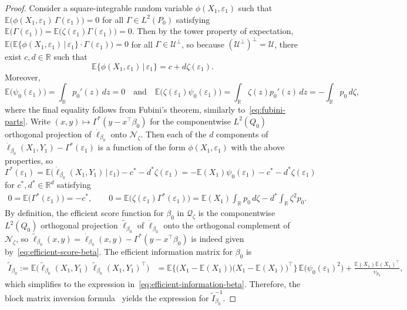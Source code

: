 \documentclass[a4paper]{article}
\newcommand{\R}{\mathbb{R}}
\newcommand{\E}{\mathbb{E}}
\theoremstyle{definition}
\begin{document}
\begin{proof}
Consider a square-integrable random variable $\phi(X_1,\varepsilon_1)$ such that $\E\bigl(\phi(X_1,\varepsilon_1)\,\Gamma(\varepsilon_1)\bigr) = 0$ for all $\Gamma \in L^2(P_0)$ satisfying $\E\bigl(\Gamma(\varepsilon_1)\bigr) = \E\bigl(\zeta(\varepsilon_1)\Gamma(\varepsilon_1)\bigr) = 0$. Then by the tower property of expectation, $\E\bigl(\E\{\phi(X_1,\varepsilon_1)\,|\,\varepsilon_1\} \cdot \Gamma(\varepsilon_1)\bigr) = 0$ for all $\Gamma \in \mathcal{U}^\perp$, so because $(\mathcal{U}^\perp)^\perp = \mathcal{U}$, there exist $c,d \in \R$ such that
\[
\E\{\phi(X_1,\varepsilon_1)\,|\,\varepsilon_1\} = c + d\zeta(\varepsilon_1).
\]
Moreover,
\[
\E\bigl(\psi_0(\varepsilon_1)\bigr) = \int_\R p_0'(z)\,dz = 0 \quad\text{and}\quad \E\bigl(\zeta(\varepsilon_1)\psi_0(\varepsilon_1)\bigr) = \int_\R \zeta(z)p_0'(z)\,dz = -\int_\R p_0\,d\zeta,
\]
where the final equality follows from Fubini's theorem, similarly to~\eqref{eq:fubini-parts}. Write $(x,y) \mapsto \Gamma^*(y - x^\top\beta_0)$ for the componentwise $L^2(Q_0)$ orthogonal projection of $\dot{\ell}_{\beta_0}$ onto $\mathcal{N}_\zeta$. Then each of the $d$ components of $\dot{\ell}_{\beta_0}(X_1,Y_1) - \Gamma^*(\varepsilon_1)$ is a function of the form $\phi(X_1,\varepsilon_1)$ with the above properties, so
\[
\Gamma^*(\varepsilon_1) = \E\bigl(\dot{\ell}_{\beta_0}(X_1,Y_1)\,|\,\varepsilon_1\bigr)- c^* - d^*\zeta(\varepsilon_1) = -\E(X_1)\psi_0(\varepsilon_1) - c^* - d^*\zeta(\varepsilon_1)
\]
for $c^*,d^* \in \R^d$ satisfying
\begin{align*}
0 = \E\bigl(\Gamma^*(\varepsilon_1)\bigr) = -c^*, \qquad 
0 = \E\bigl(\zeta(\varepsilon_1)\Gamma^*(\varepsilon_1)\bigr) = \E(X_1)\int_\R p_0\,d\zeta - d^*\int_\R \zeta^2 p_0.
\end{align*}
By definition, the efficient score function for $\beta_0$ in $\mathcal{Q}_\zeta$ is the componentwise $L^2(Q_0)$ orthogonal projection $\tilde{\ell}_{\beta_0}$ of $\dot{\ell}_{\beta_0}$ onto the orthogonal complement of $\mathcal{N}_\zeta$, so $\tilde{\ell}_{\beta_0}(x,y) = \dot{\ell}_{\beta_0}(x,y) - \Gamma^*(y - x^\top\beta_0)$ is indeed given by~\eqref{eq:efficient-score-beta}. The efficient information matrix for $\beta_0$ is
\begin{align*}
\tilde{I}_{\beta_0} := \E\bigl(\tilde{\ell}_{\beta_0}(X_1,Y_1)\,\tilde{\ell}_{\beta_0}(X_1,Y_1)^\top\bigr) &= \E\bigl\{\bigl(X_1 - \E(X_1)\bigr)\bigl(X_1 - \E(X_1)\bigr)^\top\bigr\}\,\E\bigl(\psi_0(\varepsilon_1)^2\bigr) + \frac{\E(X_1)\E(X_1)^\top}{\upsilon_{p_0}},
\end{align*}
which simplifies to the expression in~\eqref{eq:efficient-information-beta}. Therefore, the block matrix inversion formula~\citep[e.g.][Proposition~10.10.2]{samworth24modern} yields the expression for $\tilde{I}_{\beta_0}^{-1}$.
\end{proof}
\end{document}
